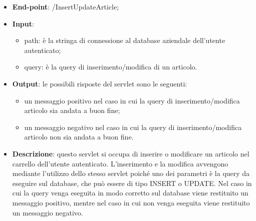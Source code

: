\begin{itemize}
	\item \textbf{End-point}: /InsertUpdateArticle;
	\item \textbf{Input}:
		\begin{itemize}
			\item path: è la stringa di connessione al database aziendale dell'utente autenticato;
			\item query: è la query di inserimento/modifica di un articolo.
		\end{itemize}
	\item \textbf{Output}: le possibili risposte del servlet sono le seguenti:
		\begin{itemize}
			\item un messaggio positivo nel caso in cui la query di inserimento/modifica articolo sia andata a buon fine;
			\item un messaggio negativo nel caso in cui la query di inserimento/modifica articolo non sia andata a buon fine.
		\end{itemize}
	\item \textbf{Descrizione}: questo servlet si occupa di inserire o modificare un articolo nel carrello dell'utente autenticato. L'inserimento e la modifica avvengono mediante l'utilizzo dello stesso servlet poiché uno dei parametri è la query da eseguire sul database, che può essere di tipo INSERT o UPDATE. Nel caso in cui la query venga eseguita in modo corretto sul database viene restituito un messaggio positivo, mentre nel caso in cui non venga eseguita viene restituito un messaggio negativo.
\end{itemize}


